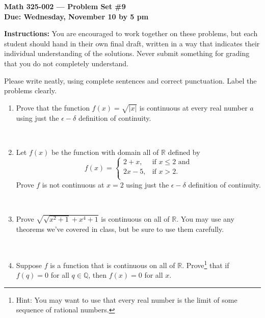 \documentclass{amsart}
\def\R{\mathbb R}
\def\Q{\mathbb Q}
\def\e{\epsilon}
\def\d{\delta}
\begin{document}
\begin{center}
{\large\bfseries
Math 325-002 --- Problem Set \#9\\
Due: Wednesday, November 10 by 5 pm}
\end{center}





{\bf Instructions:} You are encouraged to work together on these
problems, but each student should hand in their own final draft,
written in a way that indicates their individual understanding of
the solutions. Never submit something for grading
that you do not completely understand. 

Please write neatly, using complete sentences and correct
punctuation. Label the problems clearly. 






\begin{enumerate}


\item Prove that the function $f(x) = \sqrt{|x|}$ is continuous at every real number $a$ using just the $\e-\d$ definition of continuity. 
  
  \
  
\item Let $f(x)$ be the function with domain all of $\R$ defined by
  $$
  f(x) = \begin{cases}
    2 + x, & \text{if $x \leq 2$ and} \\
    2x - 5, & \text{if $x > 2$.} \\
  \end{cases}
  $$
  Prove $f$ is not continuous at $x = 2$ using just the $\e-\d$  definition of continuity.

\
 
\item Prove $\sqrt{\sqrt{x^2 +1} + x^4 + 1}$ is continuous on all of  $\R$. You may use any theorems we've covered in class, but be sure to use them carefully.

\


\item Suppose $f$ is a function that is continuous on all of $\R$. Prove\footnote{Hint: You may want to use that
  every real number is the limit of some sequence of rational numbers.} that if $f(q) = 0$ for all $q \in \Q$, then $f(x) = 0$ for all $x$. 


\end{enumerate}
\end{document}
